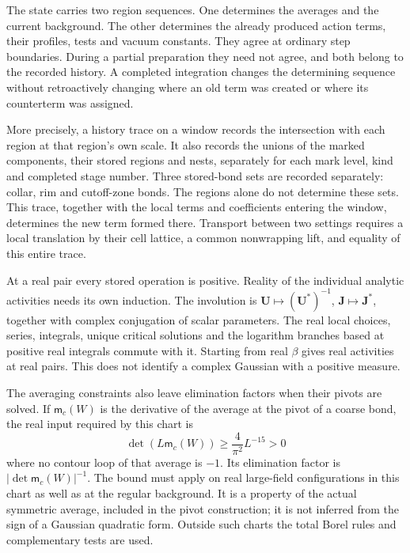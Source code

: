 \documentclass[11pt,letterpaper,reqno]{amsart}
\theoremstyle{definition}
\theoremstyle{remark}
\begin{document}
The state carries two region sequences. One determines
the averages and the current background. The other
determines the already produced action terms, their
profiles, tests and vacuum constants. They agree at
ordinary step boundaries. During a partial preparation
they need not agree, and both belong to the recorded
history. A completed integration changes the determining
sequence without retroactively changing where an old
term was created or where its counterterm was assigned.

More precisely, a history trace on a window records the
intersection with each region at that region's own
scale. It also records the unions of the marked
components, their stored regions and nests, separately
for each mark level, kind and completed stage number.
Three stored-bond sets are recorded separately: collar,
rim and cutoff-zone bonds. The regions alone do not
determine these sets. This trace, together with the
local terms and coefficients entering the window,
determines the new term formed there. Transport between
two settings requires a local translation by their cell
lattice, a common nonwrapping lift, and equality of this
entire trace.

At a real pair every stored operation is positive.
Reality of the individual analytic activities needs its
own induction. The involution is
$\mathbf U\mapsto(\mathbf U^*)^{-1}$,
$\mathbf J\mapsto\mathbf J^*$, together with complex
conjugation of scalar parameters. The real local choices,
series, integrals, unique critical solutions and the
logarithm branches based at positive real integrals
commute with it. Starting from real $\beta$ gives real
activities at real pairs. This does not identify a
complex Gaussian with a positive measure.

The averaging constraints also leave
elimination factors when their pivots
are solved. If $\mathsf m_c(W)$ is
the derivative of the average at the
pivot of a coarse bond, the real
input required by this chart is
\begin{equation}\label{eq:xrg-pivot-determinant}
 \det(L\mathsf m_c(W))
                       \ge\frac4{\pi^2}L^{-15}>0
\end{equation}
where no contour loop of that
average is $-1$. Its elimination
factor is
$|\det\mathsf m_c(W)|^{-1}$.
The bound must apply on real
large-field configurations in
this chart as well as at the
regular background. It is a
property of the actual symmetric
average, included in the pivot
construction; it is not inferred
from the sign of a Gaussian
quadratic form. Outside such
charts the total Borel rules
and complementary tests are used.
\end{document}
